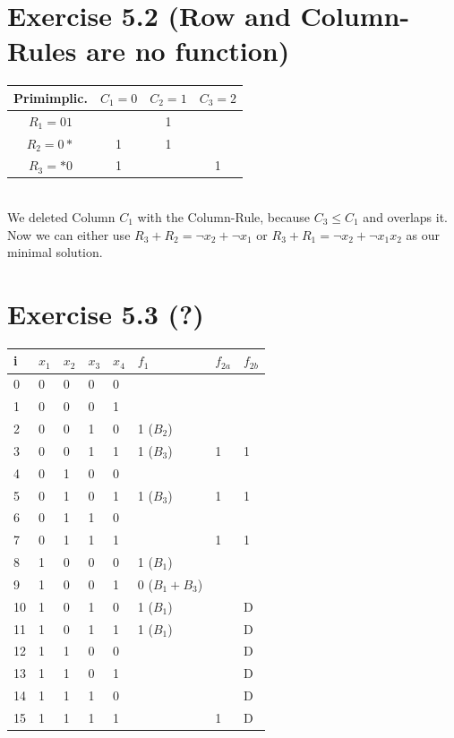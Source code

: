 \documentclass[10pt,a4paper]{scrartcl}
\begin{document}
\FloatBarrier
\newpage
\section*{Exercise 5.2 (Row and Column-Rules are no function)}
\begin{tabular}{|c||c|c|c|}
  \hline
Primimplic.       & \cellcolor{gray}$C_1=0$  & $C_2=1$   & $C_3=2$           \\ \hline\hline
$R_1 = 01$     & \cellcolor{gray}         & 1         &                   \\ \hline
$R_2 = 0\ast$  & \cellcolor{gray}1        & 1         &                   \\ \hline
$R_3 = \ast 0$ & \cellcolor{gray}1        &           & 1                 \\
  \hline
\end{tabular}\\
We deleted Column $C_1$ with the Column-Rule, because $C_3 \leq C_1$ and overlaps it. Now we can either use $R_3+R_2 = \neg x_2+\neg x_1$ or $R_3+R_1 = \neg x_2 + \neg x_1x_2$
as our minimal solution.

\FloatBarrier
\section*{Exercise 5.3 (?)}

\begin{tabular}{|l||l|l|l|l||l||l|l|}\hline
i & $x_1$ & $x_2$ & $x_3$ & $x_4$ & $f_1$ & $f_{2a}$ & $f_{2b}$ \\\hline\hline
0 & 0 & 0 & 0 & 0 &                 &   &    \\\hline
1 & 0 & 0 & 0 & 1 &                 &   &    \\\hline
2 & 0 & 0 & 1 & 0 &    1 ($B_2$)    &   &    \\\hline
3 & 0 & 0 & 1 & 1 &    1 ($B_3$)    & 1 & 1  \\\hline
4 & 0 & 1 & 0 & 0 &                 &   &    \\\hline
5 & 0 & 1 & 0 & 1 &    1 ($B_3$)    & 1 & 1  \\\hline
6 & 0 & 1 & 1 & 0 &                 &   &    \\\hline
7 & 0 & 1 & 1 & 1 &                 & 1 & 1  \\\hline
8 & 1 & 0 & 0 & 0 &    1 ($B_1$)    &   &    \\\hline
9 & 1 & 0 & 0 & 1 &    0 ($B_1+B_3$)&   &    \\\hline
10 & 1 & 0 & 1 & 0 &   1 ($B_1$)    &   & D  \\\hline
11 & 1 & 0 & 1 & 1 &   1 ($B_1$)    &   & D  \\\hline
12 & 1 & 1 & 0 & 0 &                &   & D  \\\hline
13 & 1 & 1 & 0 & 1 &                &   & D  \\\hline
14 & 1 & 1 & 1 & 0 &                &   & D  \\\hline
15 & 1 & 1 & 1 & 1 &                & 1 & D  \\\hline
\end{tabular}
\end{document}
